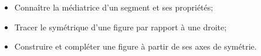 \begin{myobj}
	\begin{itemize}
		
		\item Connaître la médiatrice d'un segment et ses propriétés;
		\item Tracer le symétrique d'une figure par rapport à une droite;
		\item Construire et compléter une figure à partir de ses axes de symétrie.
	\end{itemize}
\end{myobj}
%
%		


